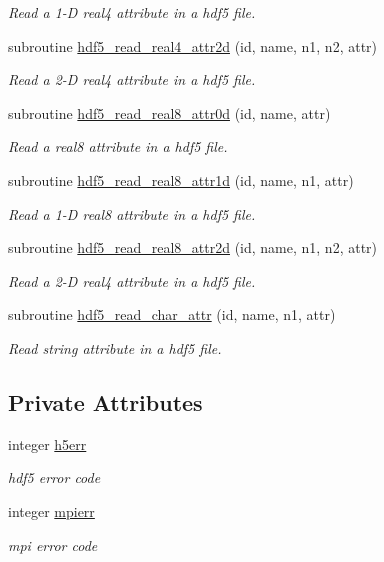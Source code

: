 \begin{DoxyCompactItemize}
\begin{DoxyCompactList}\small\item\em Read a 1-\/\-D real4 attribute in a hdf5 file. \end{DoxyCompactList}\item 
subroutine \hyperlink{classmodhdf5_a783cb12e2d85f812c506fff7cc69f37a}{hdf5\-\_\-read\-\_\-real4\-\_\-attr2d} (id, name, n1, n2, attr)
\begin{DoxyCompactList}\small\item\em Read a 2-\/\-D real4 attribute in a hdf5 file. \end{DoxyCompactList}\item 
subroutine \hyperlink{classmodhdf5_ad2a6c1b4f0229be1ac9f4e4eb0556af4}{hdf5\-\_\-read\-\_\-real8\-\_\-attr0d} (id, name, attr)
\begin{DoxyCompactList}\small\item\em Read a real8 attribute in a hdf5 file. \end{DoxyCompactList}\item 
subroutine \hyperlink{classmodhdf5_a5010be0e91c8d56afbd40530b8064d6a}{hdf5\-\_\-read\-\_\-real8\-\_\-attr1d} (id, name, n1, attr)
\begin{DoxyCompactList}\small\item\em Read a 1-\/\-D real8 attribute in a hdf5 file. \end{DoxyCompactList}\item 
subroutine \hyperlink{classmodhdf5_a85144bc1c41d08550379f855b3974507}{hdf5\-\_\-read\-\_\-real8\-\_\-attr2d} (id, name, n1, n2, attr)
\begin{DoxyCompactList}\small\item\em Read a 2-\/\-D real4 attribute in a hdf5 file. \end{DoxyCompactList}\item 
subroutine \hyperlink{classmodhdf5_a2da336bc6d0ebbf1e6d582469b741a63}{hdf5\-\_\-read\-\_\-char\-\_\-attr} (id, name, n1, attr)
\begin{DoxyCompactList}\small\item\em Read string attribute in a hdf5 file. \end{DoxyCompactList}\end{DoxyCompactItemize}
\subsection*{Private Attributes}
\begin{DoxyCompactItemize}
\item 
integer \hyperlink{classmodhdf5_a3521606545551f2d5b2222712873b228}{h5err}
\begin{DoxyCompactList}\small\item\em hdf5 error code \end{DoxyCompactList}\item 
integer \hyperlink{classmodhdf5_a2d3fcdf78d1a95860d10644e0bef1bf7}{mpierr}
\begin{DoxyCompactList}\small\item\em mpi error code \end{DoxyCompactList}\end{DoxyCompactItemize}


